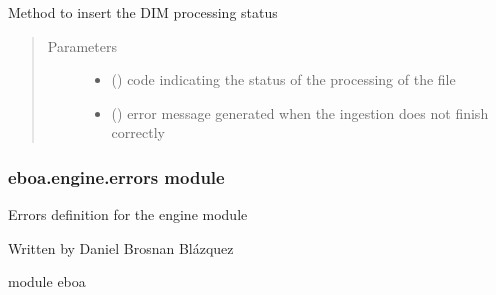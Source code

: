 \begin{fulllineitems}
\label{\detokenize{eboa.engine:eboa.engine.engine.insert_source_status}}
Method to insert the DIM processing status
\begin{quote}\begin{description}
\item[{Parameters}] \leavevmode\begin{itemize}
\item {} 
 () \textendash{} code indicating the status of the processing of the file

\item {} 
 () \textendash{} error message generated when the ingestion does not finish correctly

\end{itemize}

\end{description}\end{quote}

\end{fulllineitems}



\subsubsection{eboa.engine.errors module}
\label{\detokenize{eboa.engine:module-eboa.engine.errors}}\label{\detokenize{eboa.engine:eboa-engine-errors-module}}
Errors definition for the engine module

Written by Daniel Brosnan Blázquez

module eboa

